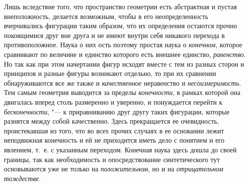 {{Лишь вследствие того, что пространство геометрии есть
абстрактная и пустая внеположность, делается возможным, чтобы в
его неопределенность вчерчивались фигурации таким образом,
что их определения остаются прочно покоящимися друг вне друга и не имеют
внутри себя никакого перехода в противоположное. Наука о них ость поэтому
простая наука о {\em конечном},
которое сравнивают по величине и единство которого есть
внешнее единство, {\em равенство}.
Но так как при этом начертании фигур исходят вместе с тем из
разных сторон и принципов и разные фигуры возникают отдельно, то при их
сравнении обнаруживаются все же также и
{\em качественное}
неравенство и
{\em несоизмеримость}.
Тем самым геометрия выводится за пределы
{\em конечности}, в
рамках которой она двигалась вперед столь размеренно и уверенно, и
понуждается перейти к
{\em бесконечности}, "--- к
приравниванию друг другу таких фигурации, которые разнятся между собой
качественно. Здесь прекращается ее очевидность, проистекавшая из того, что
во всех прочих случаях в ее основании лежит неподвижная конечность и ей не
приходится иметь дело с понятием и его явлением, т.~е. с указанным
переходом. Конечная наука здесь дошла до своей границы, так как
необходимость и опосредствование синтетического тут основываются уже не
только на {\em положительном}, но и на {\em отрицательном тождестве}.

}}
